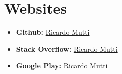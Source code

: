 \documentclass[11pt,a4paper,sans]{moderncv}
\begin{document}
\section{Websites}

\begin{itemize}


\item \textbf{Github:} \href{https://github.com/Ricardo-Mutti}{Ricardo-Mutti}
\item \textbf{Stack Overflow:} \href{https://stackoverflow.com/users/5848237/ricardo-mutti?tab=profile}{Ricardo Mutti}
\item \textbf{Google Play:} \href{https://play.google.com/store/apps/developer?id=Ricardo+Mutti}{Ricardo Mutti}

\end{itemize}
\vspace{6pt}
\end{document}
